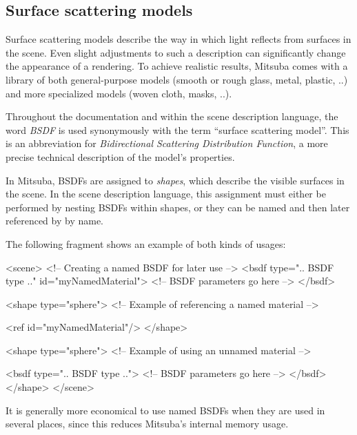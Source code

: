 \subsection{Surface scattering models}
Surface scattering models describe the way in which light reflects
from surfaces in the scene. Even slight adjustments to such a description
can significantly change the appearance of a rendering.
To achieve realistic results, Mitsuba comes with a library of 
both general-purpose models (smooth or rough glass, metal, plastic, ..) and 
more specialized models (woven cloth, masks, ..).

Throughout the documentation and within the scene description language, 
the word \emph{BSDF} is used synonymously with the term ``surface
scattering model''. This is an abbreviation for 
\emph{Bidirectional Scattering Distribution Function}, a more 
precise technical description of the model's properties.

In Mitsuba, BSDFs are assigned to \emph{shapes}, which
describe the visible surfaces in the scene. In the scene 
description language, this assignment must
either be performed by nesting BSDFs within shapes, 
or they can be named and then later referenced 
by by name.

The following fragment shows an example of both kinds of usages:
\begin{xml}
<scene>
	<!-- Creating a named BSDF for later use -->
	<bsdf type=".. BSDF type .." id="myNamedMaterial">
		<!-- BSDF parameters go here -->
	</bsdf>

	<shape type="sphere">
		<!-- Example of referencing a named material -->

		<ref id="myNamedMaterial"/>
	</shape>

	<shape type="sphere">
		<!-- Example of using an unnamed material -->

		<bsdf type=".. BSDF type ..">
			<!-- BSDF parameters go here -->
		</bsdf>
	</shape>
</scene>
\end{xml}
It is generally more economical to use named BSDFs when they
are used in several places, since this reduces Mitsuba's internal
memory usage.
